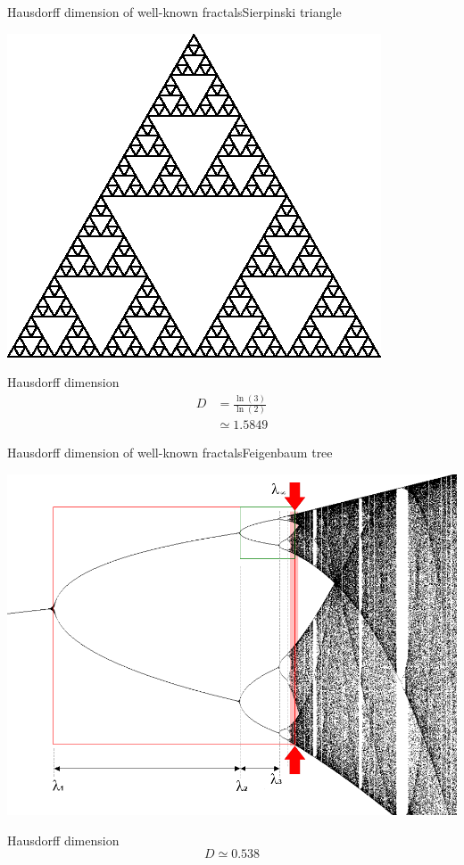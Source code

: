 \documentclass[usenames,dvipsnames,svgnames,10pt,aspectratio=169]{beamer}
\begin{document}
\begin{frame}[t, c]{Hausdorff dimension of well-known fractals}{Sierpinski triangle}
	\begin{minipage}{.48\textwidth}
		\centering
		\includegraphics[width=.8\columnwidth]{sierpinski}
	\end{minipage}%
	\hfill
	\begin{minipage}{.48\textwidth}
		\centering
		Hausdorff dimension
		$$
		\begin{aligned}
			D & = \displaystyle \frac{\ln(3)}{\ln(2)} \\
			& \simeq 1.5849
		\end{aligned}
		$$
	\end{minipage}

	\vspace{1cm}
\end{frame}

\begin{frame}[t, c]{Hausdorff dimension of well-known fractals}{Feigenbaum tree}
	\begin{minipage}{.48\textwidth}
		\centering
		\includegraphics[width=.8\columnwidth]{Feigenbaum_attractor}
	\end{minipage}%
	\hfill
	\begin{minipage}{.48\textwidth}
		\centering
		Hausdorff dimension
		$$
		D \simeq 0.538
		$$
	\end{minipage}

	\vspace{1cm}
\end{frame}
\end{document}
